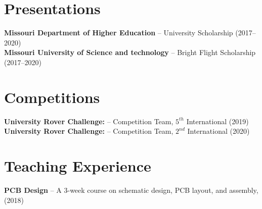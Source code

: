 \documentclass[letterpaper,11pt]{article}
\begin{document}
\section{Presentations}
\begin{itemize}[leftmargin=0.15in, label={}]
	\small{\item{\textbf{Missouri Department of Higher Education} -- University Scholarship (2017--2020)\\
	\textbf{Missouri University of Science and technology} -- Bright Flight Scholarship (2017--2020)
}}
\end{itemize}

\section{Competitions}
\begin{itemize}[leftmargin=0.15in, label={}]
	\small{\item{\textbf{University Rover Challenge:} -- Competition Team, $5^{th}$ International (2019)\\
				 \textbf{University Rover Challenge:} -- Competition Team, $2^{nd}$ International (2020)\\
	}}
\end{itemize}

\section{Teaching Experience}
\begin{itemize}[leftmargin=0.15in, label={}]
	\small{\item{\textbf{PCB Design} -- A 3-week course on schematic design, PCB layout, and assembly, (2018)
	}}
\end{itemize}

\end{document}
